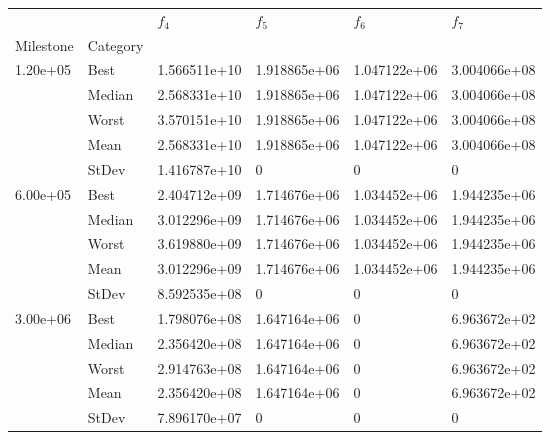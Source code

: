 \begin{tabular}{llllll}
\toprule
         &      &      $f_{4}$ &      $f_{5}$ &      $f_{6}$ &      $f_{7}$ \\
Milestone & Category &              &              &              &              \\
\midrule
\multirow{5}{*}{1.20e+05} & Best & 1.566511e+10 & 1.918865e+06 & 1.047122e+06 & 3.004066e+08 \\
         & Median & 2.568331e+10 & 1.918865e+06 & 1.047122e+06 & 3.004066e+08 \\
         & Worst & 3.570151e+10 & 1.918865e+06 & 1.047122e+06 & 3.004066e+08 \\
         & Mean & 2.568331e+10 & 1.918865e+06 & 1.047122e+06 & 3.004066e+08 \\
         & StDev & 1.416787e+10 &            0 &            0 &            0 \\
\cline{1-6}
\multirow{5}{*}{6.00e+05} & Best & 2.404712e+09 & 1.714676e+06 & 1.034452e+06 & 1.944235e+06 \\
         & Median & 3.012296e+09 & 1.714676e+06 & 1.034452e+06 & 1.944235e+06 \\
         & Worst & 3.619880e+09 & 1.714676e+06 & 1.034452e+06 & 1.944235e+06 \\
         & Mean & 3.012296e+09 & 1.714676e+06 & 1.034452e+06 & 1.944235e+06 \\
         & StDev & 8.592535e+08 &            0 &            0 &            0 \\
\cline{1-6}
\multirow{5}{*}{3.00e+06} & Best & 1.798076e+08 & 1.647164e+06 &            0 & 6.963672e+02 \\
         & Median & 2.356420e+08 & 1.647164e+06 &            0 & 6.963672e+02 \\
         & Worst & 2.914763e+08 & 1.647164e+06 &            0 & 6.963672e+02 \\
         & Mean & 2.356420e+08 & 1.647164e+06 &            0 & 6.963672e+02 \\
         & StDev & 7.896170e+07 &            0 &            0 &            0 \\
\bottomrule
\end{tabular}
